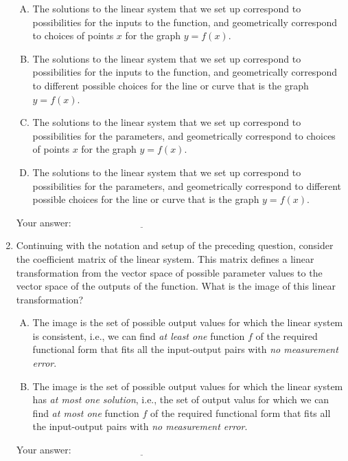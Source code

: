 \documentclass[10pt]{amsart}
\begin{document}
\begin{enumerate}
  \begin{enumerate}[(A)]
  \item The solutions to the linear system that we set up correspond
    to possibilities for the inputs to the function, and geometrically
    correspond to choices of points $x$ for the graph $y = f(x)$.
  \item The solutions to the linear system that we set up correspond
    to possibilities for the inputs to the function, and geometrically
    correspond to different possible choices for the line or curve
    that is the graph $y = f(x)$.
  \item The solutions to the linear system that we set up correspond
    to possibilities for the parameters, and geometrically correspond
    to choices of points $x$ for the graph $y = f(x)$.
  \item The solutions to the linear system that we set up correspond
    to possibilities for the parameters, and geometrically correspond
    to different possible choices for the line or curve that is the
    graph $y = f(x)$.
  \end{enumerate}

  \vspace{0.1in}
  Your answer: $\underline{\qquad\qquad\qquad\qquad\qquad\qquad\qquad}$
  \vspace{0.1in}

\item Continuing with the notation and setup of the preceding
  question, consider the coefficient matrix of the linear system. This
  matrix defines a linear transformation from the vector space of
  possible parameter values to the vector space of the outputs of the
  function. What is the image of this linear transformation?

  \begin{enumerate}[(A)]
  \item The image is the set of possible output values for which the
    linear system is consistent, i.e., we can find {\em at least one}
    function $f$ of the required functional form that fits all the
    input-output pairs with {\em no measurement error}.
  \item The image is the set of possible output values for which the
    linear system has {\em at most one solution}, i.e., the set of
    output valus for which we can find {\em at most one} function $f$
    of the required functional form that fits all the input-output
    pairs with {\em no measurement error}.
  \end{enumerate}
  \vspace{0.1in}
  Your answer: $\underline{\qquad\qquad\qquad\qquad\qquad\qquad\qquad}$
  \vspace{0.1in}


\end{enumerate}
\end{document}
